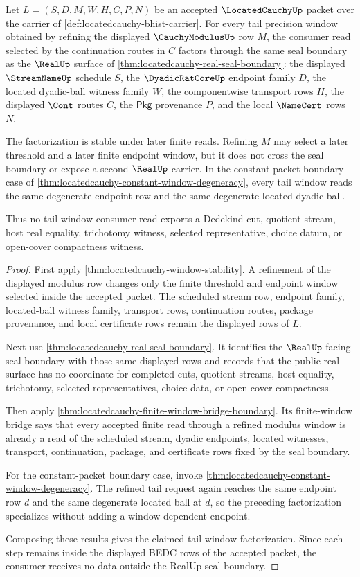 \begin{theorem}
\label{thm:locatedcauchy-tail-window-seal-factorization}
Let $L=(S,D,M,W,H,C,P,N)$ be an accepted $\LocatedCauchyUp$ packet over the
carrier of \autoref{def:locatedcauchy-bhist-carrier}. For every tail precision
window obtained by refining the displayed $\CauchyModulusUp$ row $M$, the
consumer read selected by the continuation routes in $C$ factors through the
same seal boundary as the $\RealUp$ surface of
\autoref{thm:locatedcauchy-real-seal-boundary}: the displayed
$\StreamNameUp$ schedule $S$, the $\DyadicRatCoreUp$ endpoint family $D$, the
located dyadic-ball witness family $W$, the componentwise transport rows
$H$, the displayed $\Cont$ routes $C$, the $\mathsf{Pkg}$ provenance $P$, and
the local $\NameCert$ rows $N$.

The factorization is stable under later finite reads. Refining $M$ may select a
later threshold and a later finite endpoint window, but it does not cross the
seal boundary or expose a second $\RealUp$ carrier. In the constant-packet
boundary case of \autoref{thm:locatedcauchy-constant-window-degeneracy}, every
tail window reads the same degenerate endpoint row and the same degenerate
located dyadic ball.

Thus no tail-window consumer read exports a Dedekind cut, quotient stream, host
real equality, trichotomy witness, selected representative, choice datum, or
open-cover compactness witness.
\end{theorem}
\begin{proof}
First apply \autoref{thm:locatedcauchy-window-stability}. A refinement of the
displayed modulus row changes only the finite threshold and endpoint window
selected inside the accepted packet. The scheduled stream row, endpoint
family, located-ball witness family, transport rows, continuation routes,
package provenance, and local certificate rows remain the displayed rows of
$L$.

Next use \autoref{thm:locatedcauchy-real-seal-boundary}. It identifies the
$\RealUp$-facing seal boundary with those same displayed rows and records that
the public real surface has no coordinate for completed cuts, quotient streams,
host equality, trichotomy, selected representatives, choice data, or
open-cover compactness.

Then apply \autoref{thm:locatedcauchy-finite-window-bridge-boundary}. Its
finite-window bridge says that every accepted finite read through a refined
modulus window is already a read of the scheduled stream, dyadic endpoints,
located witnesses, transport, continuation, package, and certificate rows
fixed by the seal boundary.

For the constant-packet boundary case, invoke
\autoref{thm:locatedcauchy-constant-window-degeneracy}. The refined tail
request again reaches the same endpoint row $d$ and the same degenerate
located ball at $d$, so the preceding factorization specializes without
adding a window-dependent endpoint.

Composing these results gives the claimed tail-window factorization. Since
each step remains inside the displayed BEDC rows of the accepted packet, the
consumer receives no data outside the RealUp seal boundary.
\end{proof}
